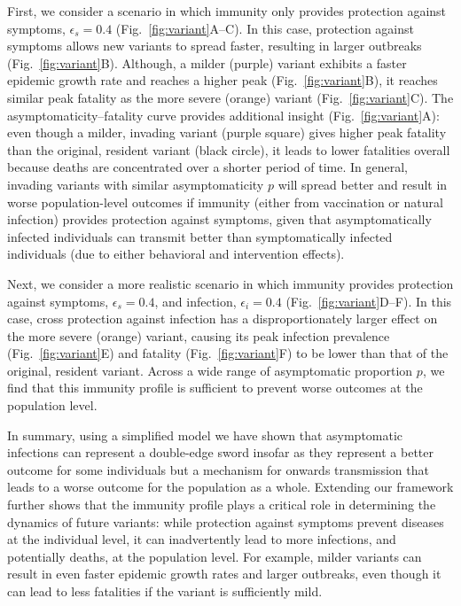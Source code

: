 \documentclass[12pt]{article}
\newcommand{\fref}[1]{Fig.~\ref{fig:#1}}
\begin{document}
First, we consider a scenario in which immunity only provides protection against symptoms, $\epsilon_s = 0.4$ (\fref{variant}A--C).
In this case, protection against symptoms allows new variants to spread faster, resulting in larger outbreaks (\fref{variant}B).
Although, a milder (purple) variant exhibits a faster epidemic growth rate and reaches a higher peak (\fref{variant}B), it reaches similar peak fatality as the more severe (orange) variant (\fref{variant}C).
The asymptomaticity--fatality curve provides additional insight (\fref{variant}A): even though a milder, invading variant (purple square) gives higher peak fatality than the original, resident variant (black circle), it leads to lower fatalities overall because deaths are concentrated over a shorter period of time.
In general, invading variants with similar asymptomaticity $p$ will spread better and result in worse population-level outcomes if immunity (either from vaccination or natural infection) provides protection against symptoms, given that asymptomatically infected individuals can transmit better than symptomatically infected individuals (due to either behavioral and intervention effects).

Next, we consider a more realistic scenario in which immunity provides protection against symptoms, $\epsilon_s = 0.4$, and infection, $\epsilon_i = 0.4$ (\fref{variant}D--F).
In this case, cross protection against infection has a disproportionately larger effect on the more severe (orange) variant, causing its peak infection prevalence (\fref{variant}E) and fatality (\fref{variant}F) to be lower than that of the original, resident variant.
Across a wide range of asymptomatic proportion $p$, we find that this immunity profile is sufficient to prevent worse outcomes at the population level.

In summary, using a simplified model we have shown that asymptomatic infections can represent a double-edge sword insofar as they represent a better outcome for some individuals but a mechanism for onwards transmission that leads to a worse outcome for the population as a whole.
Extending our framework further shows that the immunity profile plays a critical role in determining the dynamics of future variants:
while protection against symptoms prevent diseases at the individual level, it can inadvertently lead to more infections, and potentially deaths, at the population level.
For example, milder variants can result in even faster epidemic growth rates and larger outbreaks, even though it can lead to less fatalities if the variant is sufficiently mild.
\end{document}
